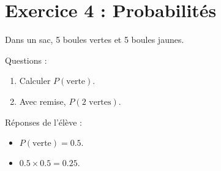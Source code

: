 \documentclass{article}
\begin{document}
\section*{Exercice 4 : Probabilités}
Dans un sac, 5 boules vertes et 5 boules jaunes.

Questions :
\begin{enumerate}
    \item Calculer $P(\text{verte})$.
    \item Avec remise, $P(\text{2 vertes})$.
\end{enumerate}

Réponses de l’élève :
\begin{itemize}
    \item $P(\text{verte}) = 0.5.$
    \item $0.5 \times 0.5 = 0.25.$
\end{itemize}
\end{document}
